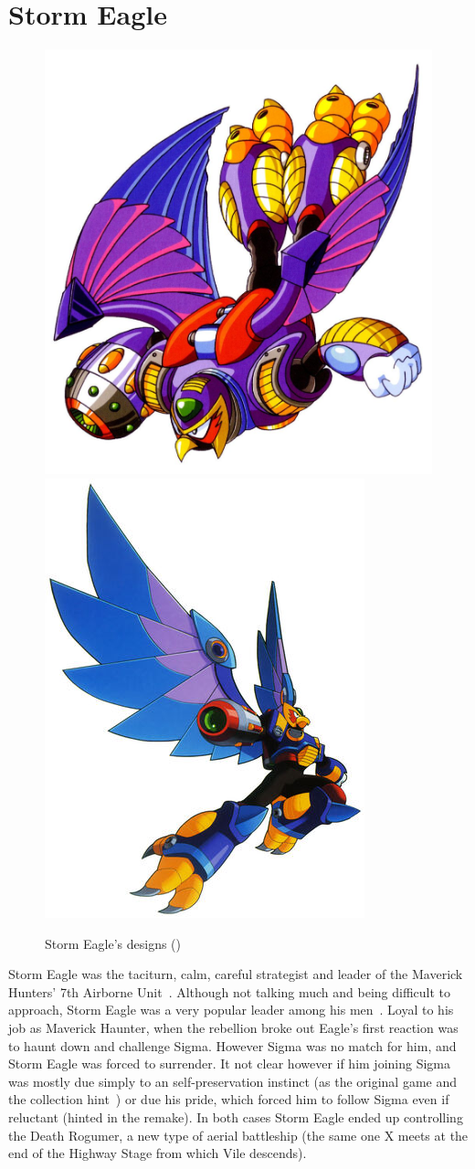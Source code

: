 \section{Storm Eagle}\label{boss:Storm_Eagle}
\begin{figure}[htp]
	\centering
	\includegraphics[width=0.4\linewidth]{figures/X1/Storm_eagle/Storm_Eagle.jpg}
	\includegraphics[width=0.4\linewidth]{figures/X1/Storm_eagle/MHXStormEagle.jpg}
	\caption{Storm Eagle's designs (\cite{book:MMX_Complete_art})}
\end{figure}
Storm Eagle was the taciturn, calm, careful strategist and leader of the Maverick Hunters' 7th Airborne Unit~\cite{wiki:Storm_eagle}. Although not talking much and being difficult to approach, Storm Eagle was a very popular leader among his men~\cite{MHX:manual}. Loyal to his job as Maverick Haunter, when the rebellion broke out Eagle's first reaction was to haunt down and challenge Sigma. However Sigma was no match for him, and Storm Eagle was forced to surrender. It not clear however if him joining Sigma was mostly due simply to an self-preservation instinct (as the original game and the collection hint~\cite{Xcoll1:Manual_X1}) or due his pride, which forced him to follow Sigma even if reluctant (hinted in the remake). In both cases Storm Eagle ended up controlling the Death Rogumer, a new type of aerial battleship (the same one X meets at the end of the Highway Stage from which Vile descends).

